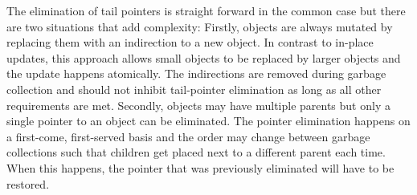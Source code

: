 \documentclass[a4paper,oneside]{memoir}
\begin{document}
The elimination of tail pointers is straight forward in the common case but there
are two situations that add complexity: Firstly, objects are always mutated by
replacing them with an indirection to a new object. In contrast to in-place updates,
this approach allows small objects to be replaced by larger objects and the update
happens atomically. The indirections are removed during garbage collection
and should not inhibit tail-pointer elimination as long as all other requirements
are met.
Secondly, objects may have multiple parents but only a single pointer to an object
can be eliminated. The pointer elimination happens on a first-come, first-served
basis and the order may change between garbage collections such that children get
placed next to a different parent each time. When this happens, the pointer
that was previously eliminated will have to be restored.
\end{document}
